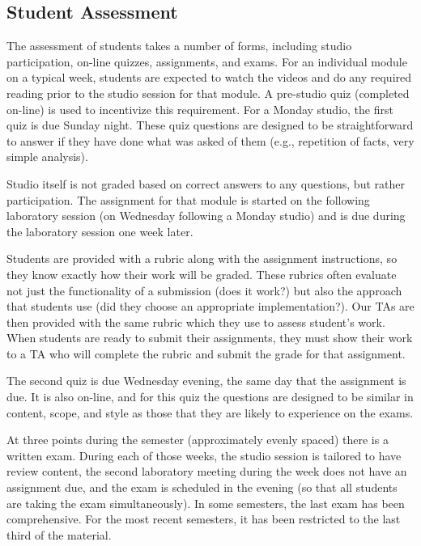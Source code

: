 \subsection{Student Assessment}

The assessment of students takes a number of forms, including studio
participation, on-line quizzes, assignments, and exams.
For an individual module on a typical week,
students are expected to watch the videos
and do any required reading prior to the studio session for that module.
A pre-studio quiz (completed on-line) is used to incentivize this
requirement.  For a Monday studio, the first quiz is due Sunday night.
These quiz questions are designed to be straightforward to answer if
they have done what was asked of them (e.g., repetition of facts,
very simple analysis).

Studio itself is not graded based on correct answers to any questions, but
rather participation. The assignment for that module is started on the
following laboratory session (on Wednesday following a Monday studio)
and is due during the laboratory session one week later.

Students are provided with a rubric along with the assignment instructions,
so they know exactly how their work will be graded. These rubrics often evaluate
not just the functionality of a submission (does it work?) but also the approach
that students use (did they choose an appropriate implementation?). Our TAs are then
provided with the same rubric which they use to assess student's work. When
students are ready to submit their assignments, they must show their work
to a TA who will complete the rubric and submit the grade for that assignment.

The second quiz is due Wednesday evening, the same day that the assignment
is due. It is also on-line, and for this quiz the questions are designed
to be similar in content, scope, and style as those that they are likely to
experience on the exams.

At three points during the semester (approximately evenly spaced) there
is a written exam.  During each of those weeks, the
studio session is tailored to have review content, the second laboratory
meeting during the week does not have an assignment due, and the
exam is scheduled in the evening (so that all students are taking the
exam simultaneously).
In some semesters, the last exam has been comprehensive.  For the most
recent semesters, it has been restricted to the last third of the material.

